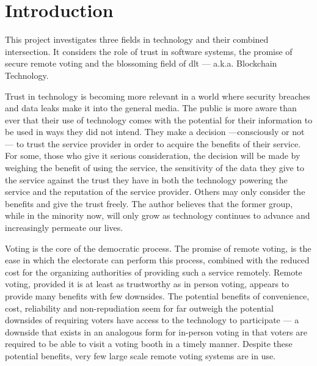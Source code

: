 \chapter{Introduction}
\label{ch:intro}

This project investigates three fields in technology and their combined intersection.
It considers the role of trust in software systems, the promise of secure remote voting and the blossoming field of \gls{dlt} --- a.k.a. Blockchain Technology.

Trust in technology is becoming more relevant in a world where security breaches and data leaks make it into the general media. The public is more aware than ever that their use of technology comes with the potential for their information to be used in ways they did not intend. They make a decision ---consciously or not--- to trust the service provider in order to acquire the benefits of their service. For some, those who give it serious consideration, the decision will be made by weighing the benefit of using the service, the sensitivity of the data they give to the service against the trust they have in both the technology powering the service and the reputation of the service provider. Others may only consider the benefits and give the trust freely. The author believes that the former group, while in the minority now, will only grow as technology continues to advance and increasingly permeate our lives.

Voting is the core of the democratic process. The promise of remote voting, is the ease in which the electorate can perform this process, combined with the reduced cost for the organizing authorities of providing such a service remotely. Remote voting, provided it is at least as trustworthy as in person voting, appears to provide many benefits with few downsides. The potential benefits of convenience, cost, reliability and non-repudiation seem for far outweigh the potential downsides of requiring voters have access to the technology to participate --- a downside that exists in an analogous form for in-person voting in that voters are required to be able to visit a voting booth in a timely manner. Despite these potential benefits, very few large scale remote voting systems are in use.

